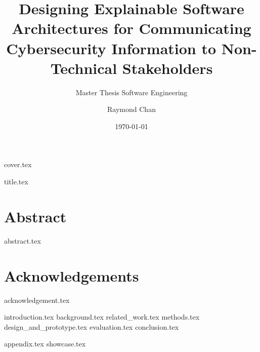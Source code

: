 \documentclass{mscthesis}
\title{Designing Explainable Software Architectures for Communicating Cybersecurity Information to Non-Technical Stakeholders}
\subtitle{Master Thesis Software Engineering}
\date{\today}
\author{Raymond Chan}
\begin{document}
%
%

\frontmatter
{cover.tex}

\cleartorecto{}
{title.tex}


\cleartorecto{}
\chapter{Abstract}
{abstract.tex}
\glsresetall{}

\cleartorecto{}
\tableofcontents{}
\clearpage{}

\listoffigures{}
\clearpage{}

\listoftables{}
\clearpage{}

\cleartorecto{}
\chapter{Acknowledgements}
{acknowledgement.tex}


\mainmatter

{introduction.tex}
{background.tex}
{related_work.tex}
{methods.tex}
{design_and_prototype.tex}
{evaluation.tex}
{conclusion.tex}

%
%

\appendix

{appendix.tex}
{showcase.tex}

%
%

\backmatter

\printbibliography{}
\cleardoublepage{}

\printacronyms[style=long,title={Acronyms}]
\cleardoublepage{}

\end{document}
